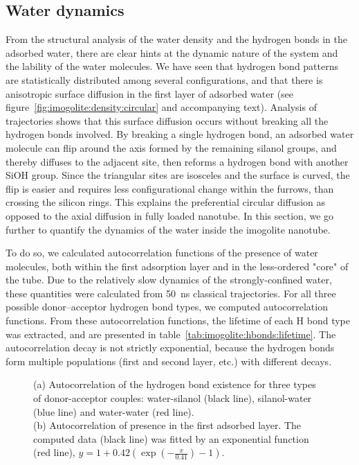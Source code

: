 \documentclass[thesis]{subfiles}
\begin{document}
\subsection{Water dynamics}

From the structural analysis of the water density and the hydrogen bonds in the
adsorbed water, there are clear hints at the dynamic nature of the system and
the lability of the water molecules. We have seen that hydrogen bond patterns
are statistically distributed among several configurations, and that there is
anisotropic surface diffusion in the first layer of adsorbed water (see
figure~\ref{fig:imogolite:density:circular} and accompanying text). Analysis of trajectories shows
that this surface diffusion occurs without breaking all the hydrogen bonds
involved. By breaking a single hydrogen bond, an adsorbed water molecule can
flip around the axis formed by the remaining silanol groups, and thereby
diffuses to the adjacent site, then reforms a hydrogen bond with
another SiOH group. Since the triangular sites are isosceles and the surface is
curved, the flip is easier and requires less configurational change within the
furrows, than crossing the silicon rings. This explains the preferential
circular diffusion as opposed to the axial diffusion in fully loaded nanotube.
In this section, we go further to quantify the dynamics of the water inside the
imogolite nanotube.

To do so, we calculated autocorrelation functions of the presence of water
molecules, both within the first adsorption layer and in the less-ordered "core"
of the tube. Due to the relatively slow dynamics of the strongly-confined water,
these quantities were calculated from \SI{50}{ns} classical trajectories. For
all three possible donor--acceptor hydrogen bond types, we computed
autocorrelation functions. From these autocorrelation functions, the lifetime of
each H bond type was extracted, and are presented in
table~\ref{tab:imogolite:hbonds:lifetime}. The autocorrelation decay is not
strictly exponential, because the hydrogen bonds form multiple populations
(first and second layer, etc.) with different decays.


\begin{figure}[t]
    \centering
    \caption{(a) Autocorrelation of the hydrogen bond existence for three types of donor-acceptor couples: water-silanol (black line), silanol-water (blue line) and water-water (red line).\\ (b) Autocorrelation of presence in the first adsorbed layer. The computed data (black line) was fitted by an exponential function (red line), $y = 1 + 0.42 (\exp(-\frac{x}{0.41})-1)$.}
    \label{fig:imogolite:hbonds:lifetime}
\end{figure}
\end{document}
